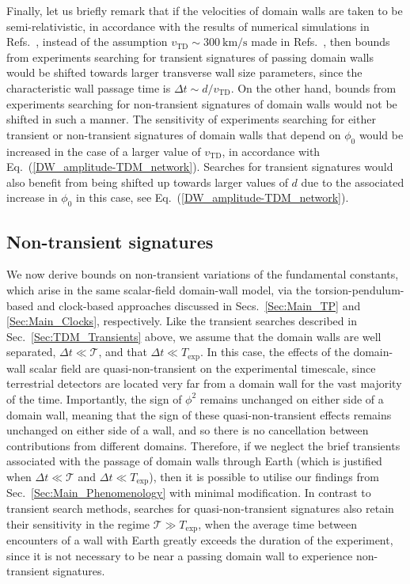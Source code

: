 \documentclass[aps,prd,onecolumn,nofootinbib]{revtex4-2} %
\begin{document}
Finally, let us briefly remark that if the velocities of domain walls are taken to be semi-relativistic, in accordance with the results of numerical simulations in Refs.~\cite{Spergel_1989_walls,Avelino2004walls,Avelino2005walls-semirelativistic}, instead of the assumption $v_\textrm{TD} \sim 300~\textrm{km/s}$ made in Refs.~\cite{Wcislo_2016_TDM-cavity,Roberts_2017_TDM-GPS,Wcislo_2018_TDM-cavity,Roberts_2019_TDM-clocks}, then bounds from experiments searching for transient signatures of passing domain walls would be shifted towards larger transverse wall size parameters, since the characteristic wall passage time is $\Delta t \sim d / v_\textrm{TD}$. 
On the other hand, bounds from experiments searching for non-transient signatures of domain walls would not be shifted in such a manner. 
The sensitivity of experiments searching for either transient or non-transient signatures of domain walls that depend on $\phi_0$ would be increased in the case of a larger value of $v_\textrm{TD}$, in accordance with Eq.~(\ref{DW_amplitude-TDM_network}). 
Searches for transient signatures would also benefit from being shifted up towards larger values of $d$ due to the associated increase in $\phi_0$ in this case, see Eq.~(\ref{DW_amplitude-TDM_network}). 




\subsection{Non-transient signatures}
\label{Sec:TDM_Non-transients}

We now derive bounds on non-transient variations of the fundamental constants, which arise in the same scalar-field domain-wall model, via the torsion-pendulum-based and clock-based approaches discussed in Secs.~\ref{Sec:Main_TP} and \ref{Sec:Main_Clocks}, respectively. 
Like the transient searches described in Sec.~\ref{Sec:TDM_Transients} above, we assume that the domain walls are well separated, $\Delta t \ll \mathcal{T}$, and that $\Delta t \ll T_\textrm{exp}$. 
In this case, the effects of the domain-wall scalar field are quasi-non-transient on the experimental timescale, since terrestrial detectors are located very far from a domain wall for the vast majority of the time. 
Importantly, the sign of $\phi^2$ remains unchanged on either side of a domain wall, meaning that the sign of these quasi-non-transient effects remains unchanged on either side of a wall, and so there is no cancellation between contributions from different domains. 
Therefore, if we neglect the brief transients associated with the passage of domain walls through Earth (which is justified when $\Delta t \ll \mathcal{T}$ and $\Delta t \ll T_\textrm{exp}$), then it is possible to utilise our findings from Sec.~\ref{Sec:Main_Phenomenology} with minimal modification. 
In contrast to transient search methods, searches for quasi-non-transient signatures also retain their sensitivity in the regime $\mathcal{T} \gg T_\textrm{exp}$, when the average time between encounters of a wall with Earth greatly exceeds the duration of the experiment, since it is not necessary to be near a passing domain wall to experience non-transient signatures. 
\end{document}
